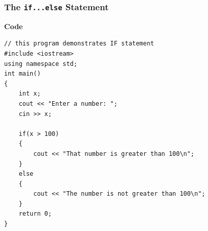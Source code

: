 \documentclass{beamer}
\begin{document}
\begin{frame}[fragile]
    \frametitle{The \texttt{if...else} Statement}
    \textbf{Code}
    \lstset{style=mystyle}
    \begin{lstlisting}
// this program demonstrates IF statement
#include <iostream>
using namespace std;
int main()
{
    int x;
    cout << "Enter a number: ";
    cin >> x;

    if(x > 100)
    {
        cout << "That number is greater than 100\n";
    }
    else
    {
        cout << "The number is not greater than 100\n";
    }
    return 0;
}\end{lstlisting}

\end{frame}
\end{document}
